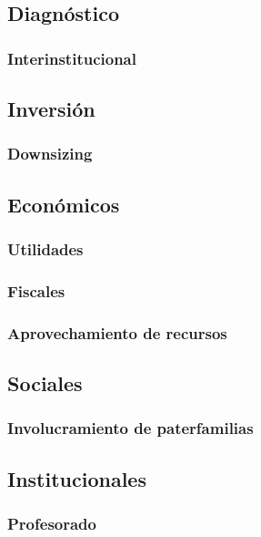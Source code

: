 \documentclass[draft,12pt,headsepline,footsepline,paper=letter]{scrreprt}
\begin{document}
\subsection{Diagnóstico}

\subsubsection{Interinstitucional}

\subsection{Inversión}

\subsubsection{Downsizing}

\subsection{Económicos}

\subsubsection{Utilidades}

\subsubsection{Fiscales}

\subsubsection{Aprovechamiento de recursos}

\subsection{Sociales}

\subsubsection{Involucramiento de paterfamilias}

\subsection{Institucionales}

\subsubsection{Profesorado}
\end{document}
